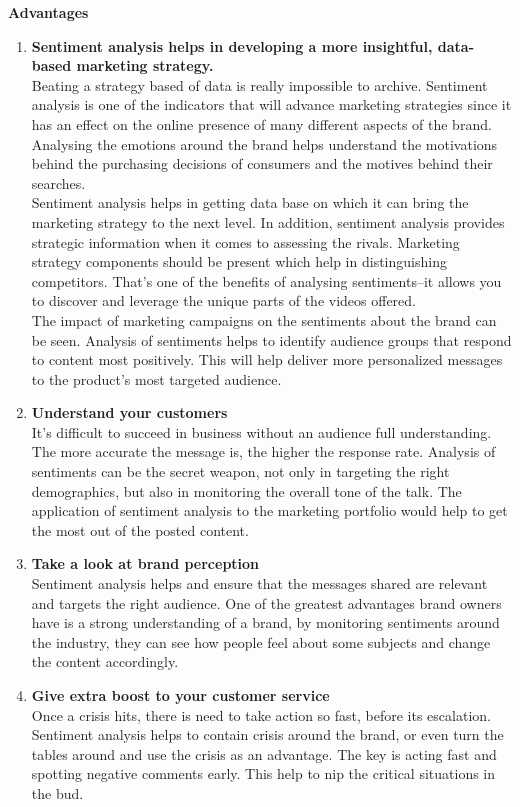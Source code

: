 \documentclass[12pt]{report}
\begin{document}
\textbf{Advantages}
\begin{enumerate}
\item \textbf{Sentiment analysis helps in developing a more insightful, data-based marketing strategy.}\\
Beating a strategy based of data is really impossible to archive. Sentiment analysis is one of the indicators that will advance marketing strategies since it has an effect on the online presence of many different aspects of the brand. Analysing the emotions around the brand helps understand the motivations behind the purchasing decisions of consumers and the motives behind their searches.\\ 

Sentiment analysis helps in getting data base on which it can bring the marketing strategy to the next level. In addition, sentiment analysis provides strategic information when it comes to assessing the rivals. Marketing strategy components should be present which help in distinguishing competitors. That's one of the benefits of analysing sentiments–it allows you to discover and leverage the unique parts of the videos offered.\\

The impact of marketing campaigns on the sentiments about the brand can be seen. Analysis of sentiments helps to identify audience groups that respond to content most positively. This will help deliver more personalized messages to the product's most targeted audience.\\

\item\textbf{ Understand your customers}\\
It's difficult to succeed in business without an audience full understanding. The more accurate the message is, the higher the response rate. Analysis of sentiments can be the secret weapon, not only in targeting the right demographics, but also in monitoring the overall tone of the talk. The application of sentiment analysis to the marketing portfolio would help to get the most out of the posted content. \\

\item \textbf{Take a look at brand perception}\\
Sentiment analysis helps and ensure that the messages shared are relevant and targets the right audience. One of the greatest advantages brand owners have is a strong understanding of a brand, by monitoring sentiments around the industry, they can see how people feel about some subjects and change the content accordingly. \\

\item \textbf{ Give extra boost to your customer service}\\
Once a crisis hits, there is need to take action so fast, before its escalation. Sentiment analysis helps to contain crisis around the brand, or even turn the tables around and use the crisis as an advantage. The key is acting fast and spotting negative comments early. This help to nip the critical situations in the bud.\\
 
\end{enumerate}
\end{document}
